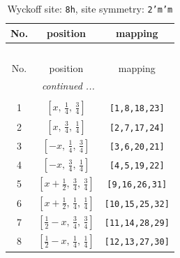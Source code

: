 \documentclass[fleqn,8pt]{jsarticle}
\begin{document}
\begin{longtable}{ccc}
\caption{Wyckoff site: {\tt 8h}, site symmetry: {\tt 2'm'm}}
 \\
 \hline \hline
No. & position & mapping \\ \hline \endfirsthead

\multicolumn{2}{l}{\tablename\ \thetable{}} \\
 \hline \hline
No. & position & mapping \\ \hline \endhead

 \hline \hline
\multicolumn{2}{r}{\footnotesize\it continued ...} \\ \endfoot

 \hline \hline
\multicolumn{2}{r}{} \\ \endlastfoot

1 & $\left[ x,\, \frac{1}{4},\, \frac{3}{4} \right]$ & {\tt [1,8,18,23]} \\ \hline
2 & $\left[ x,\, \frac{3}{4},\, \frac{1}{4} \right]$ & {\tt [2,7,17,24]} \\ \hline
3 & $\left[ - x,\, \frac{1}{4},\, \frac{3}{4} \right]$ & {\tt [3,6,20,21]} \\ \hline
4 & $\left[ - x,\, \frac{3}{4},\, \frac{1}{4} \right]$ & {\tt [4,5,19,22]} \\ \hline
5 & $\left[ x + \frac{1}{2},\, \frac{3}{4},\, \frac{3}{4} \right]$ & {\tt [9,16,26,31]} \\ \hline
6 & $\left[ x + \frac{1}{2},\, \frac{1}{4},\, \frac{1}{4} \right]$ & {\tt [10,15,25,32]} \\ \hline
7 & $\left[ \frac{1}{2} - x,\, \frac{3}{4},\, \frac{3}{4} \right]$ & {\tt [11,14,28,29]} \\ \hline
8 & $\left[ \frac{1}{2} - x,\, \frac{1}{4},\, \frac{1}{4} \right]$ & {\tt [12,13,27,30]} \\
\end{longtable}
\renewcommand{\arraystretch}{1.2}
\end{document}
